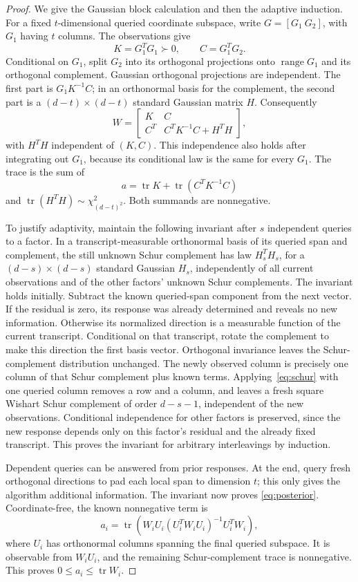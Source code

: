 \documentclass[11pt]{article}
\theoremstyle{definition}\newtheorem{definition}[theorem]{Definition}
\theoremstyle{remark}\newtheorem{remark}[theorem]{Remark}
\newcommand{\tr}{\operatorname{tr}}\newcommand{\rank}{\operatorname{rank}}
\newcommand{\range}{\operatorname{range}}\newcommand{\diag}{\operatorname{diag}}
\begin{document}
\begin{proof}
We give the Gaussian block calculation and then the adaptive induction. For a
fixed $t$-dimensional queried coordinate subspace, write $G=[G_1\ G_2]$, with
$G_1$ having $t$ columns. The observations give
\[
 K=G_1^TG_1\succ0,\qquad C=G_1^TG_2.
\]
Conditional on $G_1$, split $G_2$ into its orthogonal projections onto
$\range G_1$ and its orthogonal complement. Gaussian orthogonal projections
are independent. The first part is $G_1K^{-1}C$; in an orthonormal basis for the
complement, the second part is a $(d-t)\times(d-t)$ standard Gaussian matrix
$H$. Consequently
\begin{equation}\label{eq:schur}
 W=\begin{bmatrix}K&C\\C^T&C^TK^{-1}C+H^TH\end{bmatrix},
\end{equation}
with $H^TH$ independent of $(K,C)$. This independence also holds after integrating
out $G_1$, because its conditional law is the same for every $G_1$.
The trace is the sum of
\[
 a=\tr K+\tr(C^TK^{-1}C)
\]
and $\tr(H^TH)\sim\chi^2_{(d-t)^2}$. Both summands are nonnegative.

To justify adaptivity, maintain the following invariant after $s$ independent
queries to a factor. In a transcript-measurable orthonormal basis of its queried
span and complement, the still unknown Schur complement has law
$H_s^TH_s$, for a $(d-s)\times(d-s)$ standard Gaussian $H_s$, independently of
all current observations and of the other factors' unknown Schur complements.
The invariant holds initially. Subtract the known queried-span component from
the next vector. If the residual is zero, its response was already determined
and reveals no new information. Otherwise its normalized direction is a
measurable function of the current transcript. Conditional on that transcript,
rotate the complement to make this direction the first basis vector. Orthogonal
invariance leaves the Schur-complement distribution unchanged. The newly
observed column is precisely one column of that Schur complement plus known
terms. Applying~\eqref{eq:schur} with one queried column removes a row and a
column, and leaves a fresh square Wishart Schur complement of order $d-s-1$,
independent of the new observations. Conditional independence for other factors
is preserved, since the new response depends only on this factor's residual
and the already fixed transcript. This proves the invariant for arbitrary
interleavings by induction.

Dependent queries can be answered from prior responses. At the end, query fresh
orthogonal directions to pad each local span to dimension $t$; this only gives
the algorithm additional information. The invariant now proves
\eqref{eq:posterior}. Coordinate-free, the known nonnegative term is
\[
 a_i=\tr\left(W_i U_i(U_i^TW_iU_i)^{-1}U_i^TW_i\right),
\]
where $U_i$ has orthonormal columns spanning the final queried subspace.
It is observable from $W_iU_i$, and the remaining Schur-complement trace is
nonnegative. This proves $0\le a_i\le\tr W_i$.
\end{proof}
\end{document}
